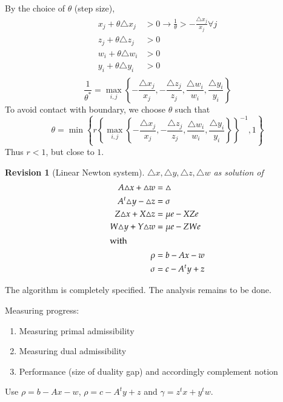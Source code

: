 \documentclass[a4paper]{article}
\numberwithin{lecref}{section}
\newtheorem*{Revision}{Revision}
\newcommand{\Set}[1]{\left\{#1\right\}}
\begin{document}
By the choice of $\theta$ (step size),
\begin{align*}
	x_j + \theta \triangle x_j &> 0 \to \frac1\theta > -\frac{\triangle x_j}{x_j} \forall j \\
	z_j + \theta \triangle z_j &> 0 \\
	w_i + \theta \triangle w_i &> 0 \\
	y_i + \theta \triangle y_i &> 0 \\
\end{align*}
\[ \frac{1}{\theta^*} = \max_{i,j} \Set{-\frac{\triangle x_j}{x_j}, -\frac{\triangle z_j}{z_j}, \frac{\triangle w_i}{w_i}, \frac{\triangle y_i}{y_i}} \]
To avoid contact with boundary, we choose $\theta$ such that
\[ \theta = \min\Set{r \Set{\max_{i, j} \Set{-\frac{\triangle x_j}{x_j}, -\frac{\triangle z_j}{z_j}, \frac{\triangle w_i}{w_i}, \frac{\triangle y_i}{y_i}}}^{-1}, 1} \]
Thus $r < 1$, but close to $1$.

\begin{Revision}[Linear Newton system]
	$\triangle x, \triangle y, \triangle z, \triangle w$ as solution of
	\begin{align*}
		A \triangle x + \triangle w &= \triangle \\
		A^t \triangle y - \triangle z &= \sigma \\
		Z \triangle x + X \triangle z &= \mu e - XZe \\
		W \triangle y + Y \triangle w &= \mu e - ZWe \\
	\intertext{with}
		\rho &= b - Ax - w \\
		\sigma &= c - A^t y + z
	\end{align*}
\end{Revision}

The algorithm is completely specified.
The analysis remains to be done.

Measuring progress:
\begin{enumerate}
	\item Measuring primal admissibility
	\item Measuring dual admissibility
	\item Performance (size of duality gap) and accordingly complement notion
\end{enumerate}
Use $\rho = b - Ax - w$, $\rho = c - A^t y + z$ and $\gamma = z^t x + y^t w$.
\end{document}
